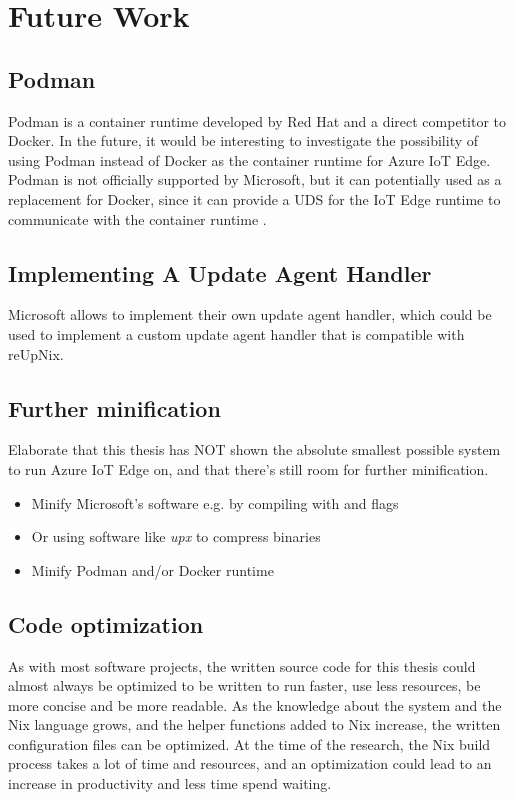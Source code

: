 \section{Future Work}

\subsection{Podman}
Podman is a container runtime developed by Red Hat and a direct competitor to Docker.
In the future, it would be interesting to investigate the possibility of using
Podman instead of Docker as the container runtime for Azure IoT Edge. Podman is
not officially supported by Microsoft, but it can potentially used as a
replacement for Docker, since it can provide a \ac{UDS} for the IoT Edge runtime
to communicate with the container runtime \cite{book:3556946,msdoc-supportetplatforms}.

\subsection{Implementing A Update Agent Handler}
\begin{tcolorbox}[title=TODO]
Microsoft allows to implement their own update agent handler, which could be
used to implement a custom update agent handler that is compatible with reUpNix.
\end{tcolorbox}

\subsection{Further minification}
\begin{tcolorbox}[title=TODO]
Elaborate that this thesis has NOT shown the absolute smallest possible system
to run Azure IoT Edge on, and that there's still room for further minification.
\begin{itemize}
    \item Minify Microsoft's software e.g. by compiling with  and  flags
    \item Or using software like \textit{upx} to compress binaries
    \item Minify Podman and/or Docker runtime
\end{itemize}
\end{tcolorbox}

\subsection{Code optimization}
As with most software projects, the written source code for this thesis could
almost always be optimized to be written to run faster, use less resources, be
more concise and be more readable. As the knowledge about the system and the
Nix language grows, and the helper functions added to Nix increase, the
written configuration files can be optimized. At the time of the research, the
Nix build process takes a lot of time and resources, and an optimization could
lead to an increase in productivity and less time spend waiting.
